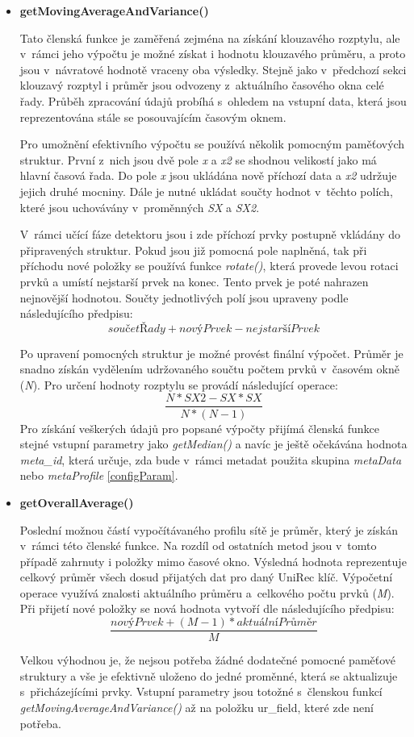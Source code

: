 \begin{itemize}
 \item \textbf{getMovingAverageAndVariance()}%
 
 Tato členská funkce je zaměřená zejména na získání klouzavého rozptylu, ale v~rámci jeho výpočtu je možné
 získat i hodnotu klouzavého průměru, a proto jsou v~návratové hodnotě vraceny oba výsledky.
 Stejně jako v~předchozí sekci klouzavý rozptyl i průměr jsou odvozeny z~aktuálního časového
 okna celé řady.
 Průběh
 zpracování údajů probíhá s~ohledem na vstupní data, která 
 jsou reprezentována stále se posouvajícím časovým oknem. 
 
 Pro umožnění efektivního výpočtu se používá několik pomocným paměťových struktur. První z~nich 
 jsou dvě pole \textit{x} a \textit{x2} se shodnou velikostí jako má hlavní časová řada. Do pole
 \textit{x} jsou ukládána
 nově příchozí data a \textit{x2} udržuje jejich druhé mocniny. Dále je nutné ukládat součty
 hodnot v~těchto polích, které jsou uchovávány v~proměnných \textit{SX} a \textit{SX2}.
 
 V~rámci učící fáze detektoru jsou i zde příchozí prvky postupně vkládány do připravených struktur.
 Pokud jsou již pomocná pole naplněná, tak při příchodu nové položky se používá funkce
 \textit{rotate()}, která provede levou rotaci prvků a umístí nejstarší prvek na konec. Tento
 prvek je poté nahrazen nejnovější hodnotou. Součty jednotlivých polí jsou upraveny podle 
 následujícího předpisu:  
 \[
  součetŘady + novýPrvek - nejstaršíPrvek
\]
 
 Po upravení pomocných struktur je možné provést finální výpočet. Průměr je snadno získán vydělením
 udržovaného součtu počtem prvků v~časovém okně (\textit{N}). Pro určení hodnoty rozptylu se provádí
 následující operace:
\[
   \frac{N * SX2 - SX * SX}{N * (N - 1)}
\]
Pro získání veškerých údajů pro popsané výpočty přijímá členská funkce stejné vstupní parametry
jako \textit{getMedian()} a navíc je ještě očekávána hodnota \textit{meta\_id}, která určuje, 
zda bude v~rámci metadat použita skupina \textit{metaData} nebo \textit{metaProfile} \ref{configParam}. 

 \item \textbf{getOverallAverage()}%
 
 Poslední možnou částí vypočítávaného profilu sítě je průměr, který je získán v~rámci 
 této členské funkce. Na rozdíl od ostatních metod jsou v~tomto případě zahrnuty i položky 
 mimo časové okno. Výsledná hodnota reprezentuje celkový průměr všech dosud přijatých dat pro 
 daný UniRec klíč. Výpočetní operace využívá znalosti aktuálního průměru a~celkového počtu prvků
 (\textit{M}). Při přijetí 
 nové položky se nová hodnota vytvoří dle následujícího předpisu:
 \[
 \frac{novýPrvek + (M - 1) * aktuálníPrůměr}{M} 
 \]

 Velkou výhodnou je, že nejsou potřeba žádné dodatečné pomocné paměťové struktury a vše je 
 efektivně uloženo do jedné proměnné, která se aktualizuje s~přicházejícími prvky. Vstupní
 parametry jsou totožné s~členskou funkcí \textit{getMovingAverageAndVariance()} až na položku
 {ur\_field}, které zde není potřeba.
\end{itemize}

